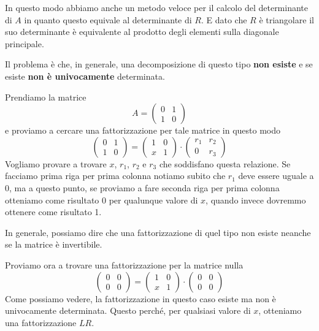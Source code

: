 \begin{observation}
	In questo modo abbiamo anche un metodo veloce per il calcolo del determinante di $A$ in quanto questo equivale
	al determinante di $R$. E dato che $R$ è triangolare il suo determinante è equivalente al prodotto degli
	elementi sulla diagonale principale.
\end{observation}

Il problema è che, in generale, una decomposizione di questo tipo \textbf{non esiste} e se esiste
\textbf{non è univocamente} determinata.

\begin{example}
	Prendiamo la matrice
	\[
		A  = \begin{pmatrix}
			0 & 1 \\
			1 & 0
		\end{pmatrix}
	\]
	e proviamo a cercare una fattorizzazione per tale matrice in questo modo
	\[
		\begin{pmatrix}
			0 & 1 \\
			1 & 0
		\end{pmatrix} =
		\begin{pmatrix}
			1 & 0 \\
			x & 1
		\end{pmatrix} \cdot
		\begin{pmatrix}
			r_1 & r_2 \\
			0   & r_3
		\end{pmatrix}
	\]
	Vogliamo provare a trovare $x$, $r_1$, $r_2$ e $r_3$ che soddisfano questa relazione. Se facciamo prima riga
	per prima colonna notiamo subito che $r_1$ deve essere uguale a 0, ma a questo punto, se proviamo a fare
	seconda riga per prima colonna otteniamo come risultato 0 per qualunque valore di $x$, quando invece dovremmo
	ottenere come risultato 1.
\end{example}

In generale, possiamo dire che una fattorizzazione di quel tipo non esiste neanche se la matrice è invertibile.

\begin{example}
	Proviamo ora a trovare una fattorizzazione per la matrice nulla
	\[
		\begin{pmatrix}
			0 & 0 \\
			0 & 0
		\end{pmatrix} =
		\begin{pmatrix}
			1 & 0 \\
			x & 1
		\end{pmatrix} \cdot
		\begin{pmatrix}
			0 & 0 \\
			0 & 0
		\end{pmatrix}
	\]
	Come possiamo vedere, la fattorizzazione in questo caso esiste ma non è univocamente determinata. Questo
	perché, per qualsiasi valore di $x$, otteniamo una fattorizzazione $LR$.
\end{example}

